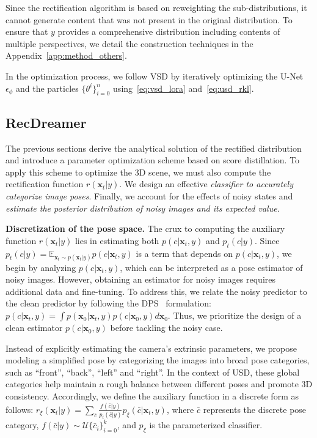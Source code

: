 Since the rectification algorithm is based on reweighting the sub-distributions, it cannot generate content that was not present in the original distribution. To ensure that $y$ provides a comprehensive distribution including contents of multiple perspectives, we detail the construction techniques in the Appendix~\ref{app:method_others}.


In the optimization process, we follow VSD by iteratively optimizing the U-Net $\epsilon_{\phi}$ and the particles $\{\theta^i\}_{i=0}^n$ using~\eqref{eq:vsd_lora} and~\eqref{eq:usd_rkl}.

\subsection{RecDreamer}\label{method:recdreamer}

The previous sections derive the analytical solution of the rectified distribution and introduce a parameter optimization scheme based on score distillation.
To apply this scheme to optimize the 3D scene, we must also compute the rectification function $r(\boldsymbol{x}_t|y)$.
We design an effective \textit{classifier to accurately categorize image poses}.
Finally, we account for the effects of noisy states and \textit{estimate the posterior distribution of noisy images and its expected value}.





\textbf{Discretization of the pose space.}
The crux to computing the auxiliary function $r(\boldsymbol{x}_t|y)$ lies in estimating both $p(c | \boldsymbol{x}_t, y)$ and $p_t(c | y)$.
Since $p_t(c | y)= \mathbb{E}_{\boldsymbol{x}_t \sim p(\boldsymbol{x}_t|y)}p(c | \boldsymbol{x}_t, y)$ is a term that depends on $p(c | \boldsymbol{x}_t, y)$, we begin by analyzing $p(c | \boldsymbol{x}_t, y)$, which can be interpreted as a pose estimator of noisy images.
However, obtaining an estimator for noisy images requires additional data and fine-tuning. To address this, we relate the noisy predictor to the clean predictor by following the DPS~\citep{chung2022diffusion} formulation: $p(c | \boldsymbol{x}_t, y) = \int p(\boldsymbol{x}_0|\boldsymbol{x}_t,y) p(c|\boldsymbol{x}_0,y) d \boldsymbol{x}_0$.
Thus, we prioritize the design of a clean estimator $p(c|\boldsymbol{x}_0, y)$ before tackling the noisy case.


Instead of explicitly estimating the camera's extrinsic parameters, we propose modeling a simplified pose by categorizing the images into broad pose categories, such as ``front'', ``back'', ``left'' and ``right''. In the context of USD, these global categories help maintain a rough balance between different poses and promote 3D consistency. Accordingly, we define the auxiliary function in a discrete form as follows: $r_\xi(\boldsymbol{x}_t|y) = \sum_{\bar{c}} \frac{f(\bar{c}|y)}{p_t(\bar{c}|y)} p_\xi(\bar{c} | \boldsymbol{x}_t, y)$, where $\bar{c}$ represents the discrete pose category, $f(\bar{c}|y) \sim \mathcal{U}\{\bar{c}_i\}_{i=0}^{k}$, and $p_\xi$ is the parameterized classifier.


